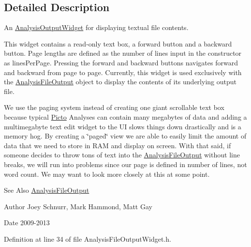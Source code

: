 \subsection{Detailed Description}
An \hyperlink{class_picto_1_1_analysis_output_widget}{Analysis\-Output\-Widget} for displaying textual file contents. 

This widget contains a read-\/only text box, a forward button and a backward button. Page lengths are defined as the number of lines input in the constructor as lines\-Per\-Page. Pressing the forward and backward buttons navigates forward and backward from page to page. Currently, this widget is used exclusively with the \hyperlink{class_picto_1_1_analysis_file_output}{Analysis\-File\-Output} object to display the contents of its underlying output file.

We use the paging system instead of creating one giant scrollable text box because typical \hyperlink{namespace_picto}{Picto} Analyses can contain many megabytes of data and adding a multimegabyte text edit widget to the U\-I slows things down drastically and is a memory hog. By creating a \char`\"{}paged\char`\"{} view we are able to easily limit the amount of data that we need to store in R\-A\-M and display on screen. With that said, if someone decides to throw tons of text into the \hyperlink{class_picto_1_1_analysis_file_output}{Analysis\-File\-Output} without line breaks, we will run into problems since our page is defined in number of lines, not word count. We may want to look more closely at this at some point. \begin{DoxySeeAlso}{See Also}
\hyperlink{class_picto_1_1_analysis_file_output}{Analysis\-File\-Output} 
\end{DoxySeeAlso}
\begin{DoxyAuthor}{Author}
Joey Schnurr, Mark Hammond, Matt Gay 
\end{DoxyAuthor}
\begin{DoxyDate}{Date}
2009-\/2013 
\end{DoxyDate}


Definition at line 34 of file Analysis\-File\-Output\-Widget.\-h.



